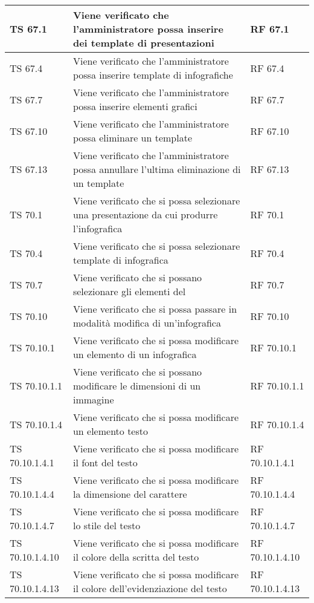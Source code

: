 {{\begin{longtable} [c]{| p{3cm} | p{6cm} |p{3cm}|}
			TS 67.1 & Viene verificato che l'amministratore possa inserire dei template\ped{g} di presentazioni & RF 67.1\\
			\hline
			TS 67.4 & Viene verificato che l'amministratore possa inserire template\ped{g} di infografiche\ped{g} & RF 67.4\\
			\hline
			TS 67.7 & Viene verificato che l'amministratore possa inserire elementi grafici & RF 67.7\\
			\hline
			TS 67.10 & Viene verificato che l'amministratore possa eliminare un template\ped{g} & RF 67.10\\
			\hline
			TS 67.13 & Viene verificato che l'amministratore possa annullare l'ultima eliminazione di un template\ped{g} & RF 67.13\\
			\hline
			TS 70.1 & Viene verificato che si possa selezionare una presentazione da cui produrre l'infografica\ped{g}  & RF 70.1\\
			\hline
			TS 70.4 & Viene verificato che si possa selezionare template\ped{g} di infografica\ped{g} & RF 70.4\\
			\hline
			TS 70.7 & Viene verificato che si possano selezionare gli elementi del  & RF 70.7\\
			\hline
			TS 70.10 & Viene verificato che si possa passare in modalità modifica di un'infografica\ped{g} & RF 70.10\\
			\hline
			TS 70.10.1 & Viene verificato che si possa modificare un elemento di un infografica\ped{g} & RF 70.10.1\\
			\hline
			TS 70.10.1.1 & Viene verificato che si possano modificare le dimensioni di un immagine & RF 70.10.1.1\\
			\hline
			TS 70.10.1.4 & Viene verificato che si possa modificare un elemento testo  & RF 70.10.1.4\\
			\hline
			TS 70.10.1.4.1 & Viene verificato che si possa modificare il font\ped{g} del testo & RF 70.10.1.4.1\\
			\hline
			TS 70.10.1.4.4 & Viene verificato che si possa modificare la dimensione del carattere & RF 70.10.1.4.4\\
			\hline
			TS 70.10.1.4.7 & Viene verificato che si possa modificare lo stile del testo & RF 70.10.1.4.7\\
			\hline
			TS 70.10.1.4.10 & Viene verificato che si possa modificare il colore della scritta del testo & RF 70.10.1.4.10\\
			\hline
			TS 70.10.1.4.13 & Viene verificato che si possa modificare il colore dell'evidenziazione del testo & RF 70.10.1.4.13\\

\end{longtable}}}
